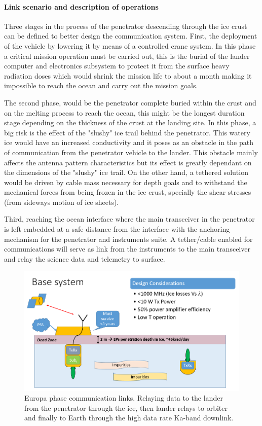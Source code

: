 \paragraph{Link scenario and description of operations}
Three stages in the process of the penetrator descending through the ice crust can be defined to better design the communication system. First, the deployment of the vehicle by lowering it by means of a controlled crane system. In this phase a critical mission operation must be carried out, this is the burial of the lander computer and electronics subsystem to protect it from the surface heavy radiation doses which would shrink the mission life to about a month making it impossible to reach the ocean and carry out the mission goals.

The second phase, would be the penetrator complete buried within the crust and on the melting process to reach the ocean, this might be the longest duration stage depending on the thickness of the crust at the landing site. In this phase, a big risk is the effect of the "slushy" ice trail behind the penetrator. This watery ice would have an increased conductivity and it poses as an obstacle in the path of communication from the penetrator vehicle to the lander. This obstacle mainly affects the antenna pattern characteristics but its effect is greatly dependant on the dimensions of the "slushy" ice trail. On the other hand, a tethered solution would be driven by cable mass necessary for depth goals and to withstand the mechanical forces from being frozen in the ice crust, specially the shear stresses (from sideways motion of ice sheets).

Third, reaching the ocean interface where the main transceiver in the penetrator is left embedded at a safe distance from the interface with the anchoring mechanism for the penetrator and instruments suite. A tether/cable enabled for communications will serve as link from the instruments to the main transceiver and relay the science data and telemetry to surface.

\begin{figure}[htb]
	\centering
	\includegraphics[width=\textwidth]{figures/comms/comm-baseDesc}
	\caption{Europa phase communication links. Relaying data to the lander from the penetrator through the ice, then lander relays to orbiter and finally to Earth through the high data rate Ka-band downlink.}
	\label{fig:europa-comms}
\end{figure}

